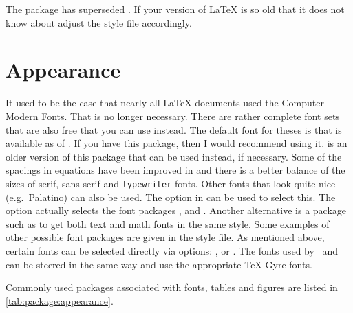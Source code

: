 The package  has superseded .
If your version of \LaTeX{} is so old that it does not know about
 adjust the  style file accordingly.

\section{Appearance}%
\label{sec:package:appearance}

It used to be the case that nearly all \LaTeX{} documents used the
Computer Modern Fonts. That is no longer necessary. There are rather
complete font sets that are also free that you can use instead.
The default font for theses is  that is available as of .
If you have this package, then I would recommend using it.
 is an older version of this package that can be used instead, if necessary.
Some of the spacings in equations have been improved in 
and there is a better balance of the sizes of serif, \textsf{sans serif} and \texttt{typewriter} fonts.
Other fonts that look quite nice (e.g.\ Palatino) can also be used.
The option  in  can be used to select this.
The option actually selects the font packages ,  and .
Another alternative is a package such as  
to get both text and math fonts in the same style. 
Some examples of other possible font packages are given in the style file.
As mentioned above, certain fonts can be selected directly via options:
,  or .
The fonts used by \LuaLaTeX\ and \XeLaTeX can be steered in the same way
and use the appropriate TeX Gyre fonts.

Commonly used packages associated with fonts, tables and
figures are listed in \cref{tab:package:appearance}.


